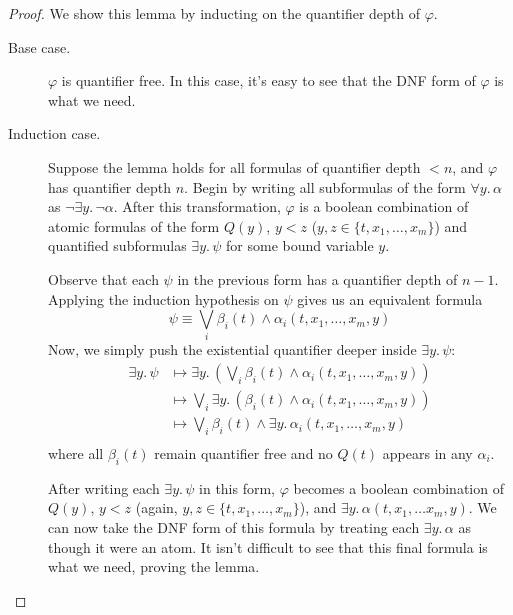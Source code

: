 \documentclass[a4paper,UKenglish,cleveref, autoref, thm-restate, numberwithinsect]{lipics-v2021}
\begin{document}
\begin{proof}
    We show this lemma by inducting on the quantifier depth of $\varphi$.
    \begin{description}
        \item[Base case.] $\varphi$ is quantifier free. In this case, it's easy to see that the DNF form of $\varphi$ is what we need.
        \item[Induction case.] Suppose the lemma holds for all formulas of quantifier depth $< n$, and $\varphi$ has quantifier depth $n$. Begin by writing all subformulas of the form $\forall y.\, \alpha$ as $\lnot \exists y.\, \lnot \alpha$. After this transformation, $\varphi$ is a boolean combination of atomic formulas of the form $Q(y)$, $y < z$ ($y, z \in \{t, x_1, \ldots, x_m\}$) and quantified subformulas $\exists y.\, \psi$ for some bound variable $y$.

        Observe that each $\psi$ in the previous form has a quantifier depth of $n-1$. Applying the induction hypothesis on $\psi$ gives us an equivalent formula
        \begin{equation*}
            \psi \equiv \bigvee_i \beta_i(t) \land \alpha_i(t, x_1, \ldots, x_m, y)
        \end{equation*}
        Now, we simply push the existential quantifier deeper inside $\exists y.\, \psi$:
        \begin{equation*}
            \begin{aligned}
                \exists y.\, \psi &\longmapsto \exists y.\, \left( \bigvee_i \beta_i(t) \land \alpha_i(t, x_1, \ldots, x_m, y) \right)\\
                &\longmapsto \bigvee_i \exists y.\, \left( \beta_i(t) \land \alpha_i(t, x_1, \ldots, x_m, y) \right)\\
                &\longmapsto \bigvee_i \beta_i(t) \land \exists y.\, \alpha_i(t, x_1, \ldots, x_m, y)\\
            \end{aligned}
        \end{equation*}
        where all $\beta_i(t)$ remain quantifier free and no $Q(t)$ appears in any $\alpha_i$.

        After writing each $\exists y.\, \psi$ in this form, $\varphi$ becomes a boolean combination of $Q(y)$, $y < z$ (again, $y, z \in \{t, x_1, \ldots, x_m\}$), and $\exists y.\, \alpha(t, x_1, \ldots x_m, y)$. We can now take the DNF form of this formula by treating each $\exists y.\, \alpha$ as though it were an atom. It isn't difficult to see that this final formula is what we need, proving the lemma.
    \end{description}
\end{proof}
\end{document}
